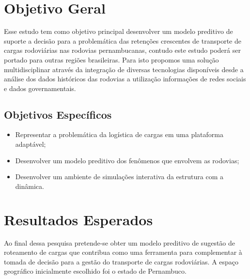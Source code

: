 \pagebreak

\section{ Objetivo Geral}\label{intro:objetivo}

Esse estudo tem como objetivo principal desenvolver um modelo preditivo de suporte a decisão para a problemática das retenções crescentes de transporte de cargas rodoviárias 
nas rodovias pernambucanas, contudo este estudo poderá ser portado para outras regiões brasileiras. 
Para isto propomos uma solução multidisciplinar através da integração de diversas tecnologias disponíveis desde a análise dos dados históricos das 
rodovias a utilização informações de redes sociais e dados governamentais.

\subsection{ Objetivos Específicos}\label{intro:especificos}

\begin{itemize}
 \item Representar a problemática da logística de cargas em uma plataforma adaptável;
 \item Desenvolver um modelo preditivo dos fenômenos que envolvem as rodovias;
 \item Desenvolver um ambiente de simulações interativa da estrutura com a dinâmica.
\end{itemize}


\section{ Resultados Esperados}\label{resultado}

Ao final dessa pesquisa pretende-se obter um modelo preditivo de sugestão de roteamento de cargas
que contribua como uma ferramenta para complementar à tomada de decisão para a gestão do transporte 
de cargas rodoviárias.
A espaço geográfico inicialmente escolhido foi o estado de Pernambuco.








